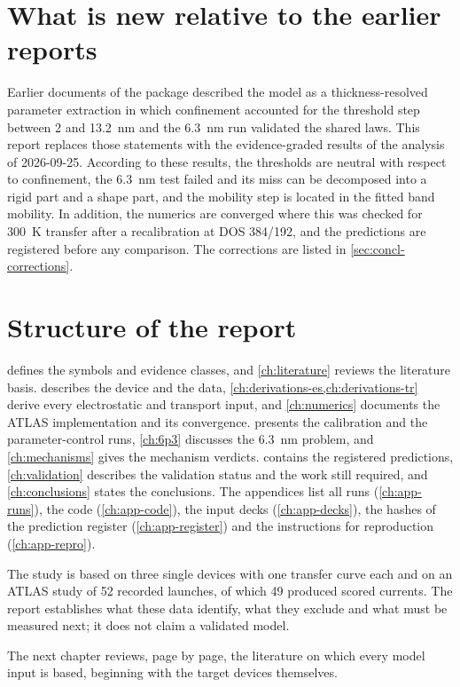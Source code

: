 \section{What is new relative to the earlier reports}\label{sec:intro-new}

Earlier documents of the package described the model as a thickness-resolved parameter extraction in which confinement accounted for the threshold step between 2 and 13.2~nm and the 6.3~nm run validated the shared laws. This report replaces those statements with the evidence-graded results of the analysis of 2026-09-25. According to these results, the thresholds are neutral with respect to confinement, the 6.3~nm test failed and its miss can be decomposed into a rigid part and a shape part, and the mobility step is located in the fitted band mobility. In addition, the numerics are converged where this was checked for 300~K transfer after a recalibration at DOS 384/192, and the predictions are registered before any comparison. The corrections are listed in \cref{sec:concl-corrections}.

\section{Structure of the report}\label{sec:intro-roadmap}

 defines the symbols and evidence classes, and \cref{ch:literature} reviews the literature basis.  describes the device and the data, \cref{ch:derivations-es,ch:derivations-tr} derive every electrostatic and transport input, and \cref{ch:numerics} documents the ATLAS implementation and its convergence.  presents the calibration and the parameter-control runs, \cref{ch:6p3} discusses the 6.3~nm problem, and \cref{ch:mechanisms} gives the mechanism verdicts.  contains the registered predictions, \cref{ch:validation} describes the validation status and the work still required, and \cref{ch:conclusions} states the conclusions. The appendices list all runs (\cref{ch:app-runs}), the code (\cref{ch:app-code}), the input decks (\cref{ch:app-decks}), the hashes of the prediction register (\cref{ch:app-register}) and the instructions for reproduction (\cref{ch:app-repro}).

\begin{keyresult}[title={Key point: scope}]
The study is based on three single devices with one transfer curve each and on an ATLAS study of 52 recorded launches, of which 49 produced scored currents. The report establishes what these data identify, what they exclude and what must be measured next; it does not claim a validated model.
\end{keyresult}

The next chapter reviews, page by page, the literature on which every model input is based, beginning with the target devices themselves.
